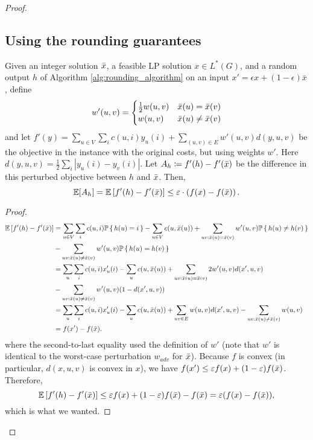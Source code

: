 \begin{proof}
\subsection{Using the rounding guarantees}
\begin{lemma}\label{lem:Ahupp}
Given an integer solution $\bar{x}$, a feasible LP solution $x \in L^*(G)$, and a random output $h$ of Algorithm \ref{alg:rounding_algorithm} on an input $x' = \epsilon x + (1-\epsilon)\bar{x}$, define
\[
    w'(u,v) = \begin{cases}
    \frac{1}{2}w(u,v) & \bar{x}(u) = 
    \bar{x}(v)\\
    w(u,v) & \bar{x}(u) \ne \bar{x}(v)
\end{cases}
\]
and let $f'(y) = \sum_{u\in V}\sum_i c(u,i)y_u(i) + \sum_{(u,v) \in E}w'(u,v)d(y,u,v)$ be the objective in the instance with the original costs, but using weights $w'$. Here $d(y,u,v) = \frac{1}{2}\sum_i|y_u(i) - y_v(i)|$. Let $A_h \coloneqq f'(h) - f'(\bar{x})$ be the difference in this perturbed objective between $h$ and $\bar{x}$. Then,
\[
 \operatorname*{\mathbb{E}}[A_h] = \operatorname*{\mathbb{E}}{[f'(h) - f'(\bar{x})]} \le \varepsilon \cdot \left(f(x) - f(\bar{x})\right).
\]
\end{lemma}
\begin{proof}
\begin{align*}
\operatorname*{\mathbb{E}}{[f'(h) - f'(\bar{x})]} &= \sum_{u\in V}\sum_{i}c(u,i)\mathbb{P}\set{h(u) = i} - \sum_{u\in V}c(u,\bar{x}(u)) + \sum_{uv : \bar{x}(u) = \bar{x}(v)} w'(u,v)\mathbb{P}\set{h(u) \ne h(v)} \\
\qquad\qquad &- \sum_{uv : \bar{x}(u) \neq \bar{x}(v)} w'(u,v)\mathbb{P}\set{h(u) = h(v)}\\
&= \sum_u\sum_ic(u,i)x'_u(i) - \sum_uc(u,\bar{x}(u)) + \sum_{uv: \bar{x}(u)=\bar{x}(v)}2w'(u,v)d(x',u,v) \\
&- \sum_{uv : \bar{x}(u) \ne \bar{x}(v)}w'(u,v)(1-d(x',u,v))\\
&= \sum_u\sum_ic(u,i)x'_u(i) - \sum_uc(u,\bar{x}(u)) + \sum_{uv\in E}w(u,v)d(x',u,v)- \sum_{uv : \bar{x}(u) \ne \bar{x}(v)}w(u,v)\\
&= f(x') - f(\bar{x}).
\end{align*}
where the second-to-last equality used the definition of $w'$ (note that $w'$ is identical to the worst-case perturbation $w_{adv}$ for $\bar{x}$). Because $f$ is convex (in particular, $d(x,u,v)$ is convex in $x$), we have $f(x') \le \varepsilon f(x) + (1-\varepsilon)f(\bar{x})$. Therefore,
\[
\operatorname*{\mathbb{E}}{[f'(h) - f'(\bar{x})]} \le \varepsilon f(x) + (1-\varepsilon)f(\bar{x}) - f(\bar{x}) = \varepsilon(f(x) - f(\bar{x})),
\]
which is what we wanted.
\end{proof}


\end{proof}
